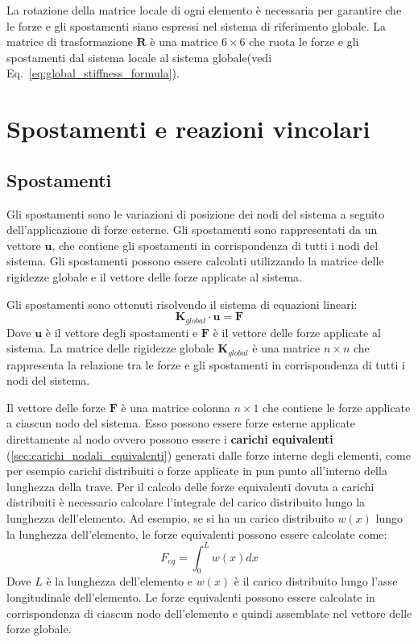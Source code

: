 \documentclass[10pt,a4paper]{article}
\begin{document}
La rotazione della matrice locale di ogni elemento è necessaria per garantire che le forze e gli spostamenti siano espressi nel sistema di riferimento globale. La matrice di trasformazione $\mathbf{R}$ è una matrice $6 \times 6$ che ruota le forze e gli spostamenti dal sistema locale al sistema globale(vedi Eq.~\ref{eq:global_stiffness_formula}).

\section{Spostamenti e reazioni vincolari}

\subsection{Spostamenti}
Gli spostamenti sono le variazioni di posizione dei nodi del sistema a seguito dell'applicazione di forze esterne. Gli spostamenti sono rappresentati da un vettore $\mathbf{u}$, che contiene gli spostamenti in corrispondenza di tutti i nodi del sistema. Gli spostamenti possono essere calcolati utilizzando la matrice delle rigidezze globale e il vettore delle forze applicate al sistema.

Gli spostamenti sono ottenuti risolvendo il sistema di equazioni lineari:
\begin{equation}
    \mathbf{K}_{global} \cdot \mathbf{u} = \mathbf{F}
\end{equation}
Dove $\mathbf{u}$ è il vettore degli spostamenti e $\mathbf{F}$ è il vettore delle forze applicate al sistema. La matrice delle rigidezze globale $\mathbf{K}_{global}$ è una matrice $n \times n$ che rappresenta la relazione tra le forze e gli spostamenti in corrispondenza di tutti i nodi del sistema.

Il vettore delle forze $\mathbf{F}$ è una matrice colonna $n \times 1$ che contiene le forze applicate a ciascun nodo del sistema. Esso possono essere forze esterne applicate direttamente al nodo ovvero possono essere i \textbf{carichi equivalenti} (\ref{sec:carichi_nodali_equivalenti}) generati dalle forze interne degli elementi, come per esempio carichi distribuiti o forze applicate in pun punto all'interno della lunghezza della trave.
Per il calcolo delle forze equivalenti dovuta a carichi distribuiti è necessario calcolare l'integrale del carico distribuito lungo la lunghezza dell'elemento. Ad esempio, se si ha un carico distribuito $w(x)$ lungo la lunghezza dell'elemento, le forze equivalenti possono essere calcolate come:
\begin{equation}
    F_{eq} = \int_0^L w(x) dx
\end{equation}
Dove $L$ è la lunghezza dell'elemento e $w(x)$ è il carico distribuito lungo l'asse longitudinale dell'elemento. Le forze equivalenti possono essere calcolate in corrispondenza di ciascun nodo dell'elemento e quindi assemblate nel vettore delle forze globale.
\end{document}
